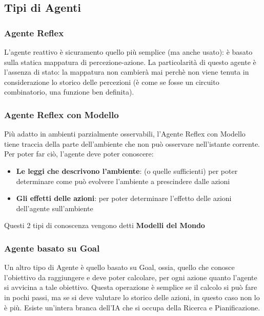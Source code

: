 \subsection{Tipi di Agenti}
\subsubsection{Agente Reflex}
L'agente reattivo è sicuramento quello più semplice (ma anche usato): è basato sulla statica mappatura 
di percezione-azione. La particolarità di questo agente è l'assenza di stato: la mappatura non cambierà mai perchè 
non viene tenuta in considerazione lo storico delle percezioni (è come se fosse un circuito combinatorio, una funzione ben definita).

\subsubsection{Agente Reflex con Modello}
Più adatto in ambienti parzialmente osservabili, l'Agente Reflex con Modello tiene traccia della parte dell'ambiente che non può osservare nell'istante corrente.
Per poter far ciò, l'agente deve poter conoscere:
\begin{itemize}
    \item \textbf{Le leggi che descrivono l'ambiente}: (o quelle sufficienti) per poter determinare come può evolvere l'ambiente a prescindere dalle azioni
    \item \textbf{Gli effetti delle azioni}: per poter determinare l'effetto delle azioni dell'agente sull'ambiente 
\end{itemize}
Questi 2 tipi di conoscenza vengono detti \textbf{Modelli del Mondo}

\subsubsection{Agente basato su Goal}
Un altro tipo di Agente è quello basato su Goal, ossia, quello che conosce l'obiettivo da raggiungere e deve poter calcolare, per ogni azione
quanto l'agente si avvicina a tale obiettivo. Questa operazione è semplice se il calcolo si può fare in pochi passi, ma se si deve valutare lo storico
delle azioni, in questo caso non lo è più. Esiste un'intera branca dell'IA che si occupa della Ricerca e Pianificazione.\\ 

